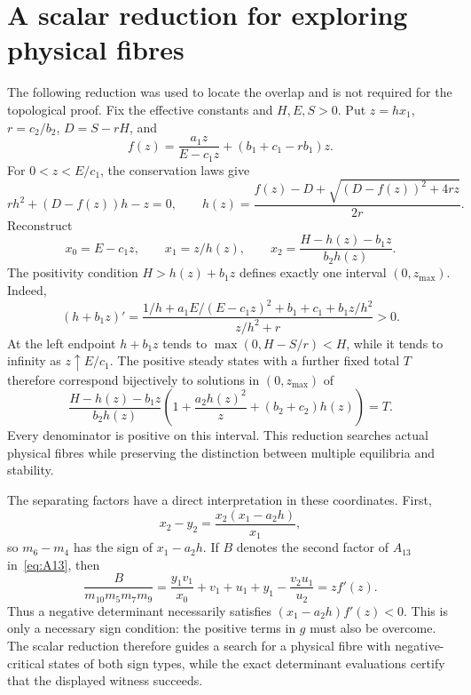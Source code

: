 \documentclass[11pt,a4paper]{article}
\numberwithin{equation}{section}
\theoremstyle{remark}\newtheorem{remark}[theorem]{Remark}
\begin{document}
\section{A scalar reduction for exploring physical fibres}\label{app:scalar}
The following reduction was used to locate the overlap and is not required for the topological proof. Fix the effective constants and $H,E,S>0$. Put $z=hx_1$, $r=c_2/b_2$, $D=S-rH$, and
\[
f(z)=\frac{a_1z}{E-c_1z}+(b_1+c_1-rb_1)z.
\]
For $0<z<E/c_1$, the conservation laws give
\[
rh^2+(D-f(z))h-z=0,
\qquad h(z)=\frac{f(z)-D+\sqrt{(D-f(z))^2+4rz}}{2r}.
\]
Reconstruct
\[
x_0=E-c_1z,\qquad x_1=z/h(z),\qquad
x_2=\frac{H-h(z)-b_1z}{b_2h(z)}.
\]
The positivity condition $H>h(z)+b_1z$ defines exactly one interval $(0,z_{\max})$. Indeed,
\[
(h+b_1z)'=
\frac{1/h+a_1E/(E-c_1z)^2+b_1+c_1+b_1z/h^2}{z/h^2+r}>0.
\]
At the left endpoint $h+b_1z$ tends to $\max(0,H-S/r)<H$, while it tends to infinity as $z\uparrow E/c_1$. The positive steady states with a further fixed total $T$ therefore correspond bijectively to solutions in $(0,z_{\max})$ of
\[
\frac{H-h(z)-b_1z}{b_2h(z)}
\left(1+\frac{a_2h(z)^2}{z}+(b_2+c_2)h(z)\right)=T.
\]
Every denominator is positive on this interval. This reduction searches actual physical fibres while preserving the distinction between multiple equilibria and stability.

The separating factors have a direct interpretation in these coordinates.
First,
\[
x_2-y_2=\frac{x_2(x_1-a_2h)}{x_1},
\]
so $m_6-m_4$ has the sign of $x_1-a_2h$. If $B$ denotes the second factor of $A_{13}$ in~\eqref{eq:A13}, then
\[
\frac{B}{m_{10}m_5m_7m_9}
 =\frac{y_1v_1}{x_0}+v_1+u_1+y_1-\frac{v_2u_1}{u_2}
 =z f'(z).
\]
Thus a negative determinant necessarily satisfies $(x_1-a_2h)f'(z)<0$.
This is only a necessary sign condition: the positive terms in $g$ must
also be overcome. The scalar reduction therefore guides a search for a
physical fibre with negative-critical states of both sign types, while the
exact determinant evaluations certify that the displayed witness succeeds.
\end{document}
